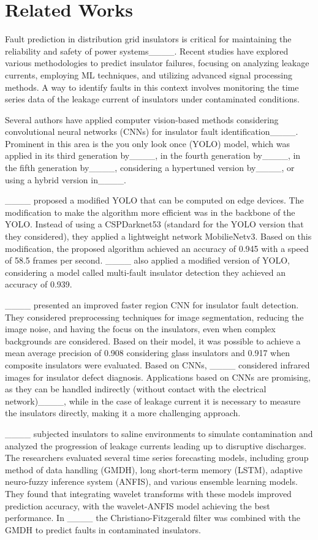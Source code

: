 \section{Related Works}
\label{2}

Fault prediction in distribution grid insulators is critical for maintaining the reliability and safety of power systems____. Recent studies have explored various methodologies to predict insulator failures, focusing on analyzing leakage currents, employing ML techniques, and utilizing advanced signal processing methods. A way to identify faults in this context involves monitoring the time series data of the leakage current of insulators under contaminated conditions.

Several authors have applied computer vision-based methods considering convolutional neural networks (CNNs)  for insulator fault identification____. Prominent in this area is the you only look once (YOLO) model, which was applied in its third generation by____, in the fourth generation by____, in the fifth generation by____, considering a hypertuned version by____, or using a hybrid version in____. 

____ proposed a modified YOLO that can be computed on edge devices. The modification to make the algorithm more efficient was in the backbone of the YOLO. Instead of using a CSPDarknet53 (standard for the YOLO version that they considered), they applied a lightweight network MobilieNetv3. Based on this modification, the proposed algorithm achieved an accuracy of 0.945 with a speed of 58.5 frames per second. ____ also applied a modified version of YOLO, considering a model called multi-fault insulator detection they achieved an accuracy of 0.939. 


____ presented an improved faster region CNN for insulator fault detection. They considered preprocessing techniques for image segmentation, reducing the image noise, and having the focus on the insulators, even when complex backgrounds are considered. Based on their model, it was possible to achieve a mean average precision of 0.908 considering glass insulators and 0.917 when composite insulators were evaluated. Based on CNNs, ____ considered infrared images for insulator defect diagnosis. Applications based on CNNs are promising, as they can be handled indirectly (without contact with the electrical network)____, while in the case of leakage current it is necessary to measure the insulators directly, making it a more challenging approach.

____ subjected insulators to saline environments to simulate contamination and analyzed the progression of leakage currents leading up to disruptive discharges. The researchers evaluated several time series forecasting models, including group method of data handling (GMDH), long short-term memory (LSTM), adaptive neuro-fuzzy inference system (ANFIS), and various ensemble learning models. They found that integrating wavelet transforms with these models improved prediction accuracy, with the wavelet-ANFIS model achieving the best performance. In ____ the Christiano-Fitzgerald filter was combined with the GMDH to predict faults in contaminated insulators.

